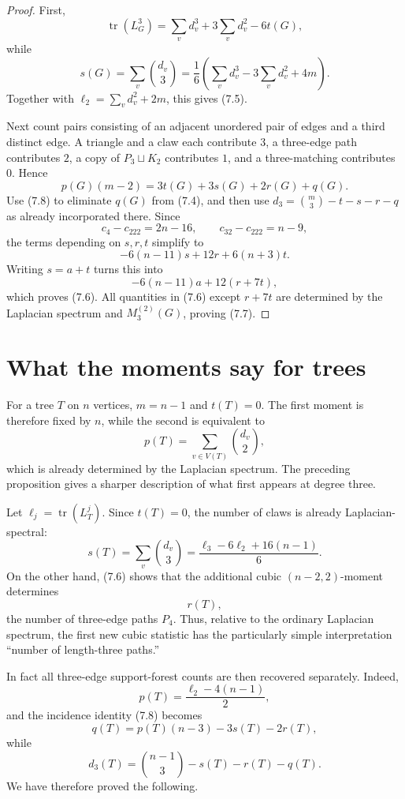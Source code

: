 \documentclass{amsart}
\theoremstyle{definition}
\newcommand{\tr}{\operatorname{tr}}
\begin{document}
\begin{proof}
First,
\[
\tr(L_G^3)=\sum_v d_v^3+3\sum_vd_v^2-6t(G),
\]
while
\[
s(G)=\sum_v\binom{d_v}{3}
=\frac{1}{6}\left(\sum_vd_v^3-3\sum_vd_v^2+4m\right).
\]
Together with $\ell_2=\sum_vd_v^2+2m$, this gives (7.5).

Next count pairs consisting of an adjacent unordered pair of edges and a
third distinct edge.  A triangle and a claw each contribute $3$, a
three-edge path contributes $2$, a copy of $P_3\sqcup K_2$ contributes $1$,
and a three-matching contributes $0$.  Hence
\[
p(G)(m-2)=3t(G)+3s(G)+2r(G)+q(G).
\tag{7.8}
\]
Use (7.8) to eliminate $q(G)$ from (7.4), and then use
$d_3=\binom m3-t-s-r-q$ as already incorporated there.  Since
\[
c_4-c_{222}=2n-16,\qquad
c_{32}-c_{222}=n-9,
\]
the terms depending on $s,r,t$ simplify to
\[
-6(n-11)s+12r+6(n+3)t.
\]
Writing $s=a+t$ turns this into
\[
-6(n-11)a+12(r+7t),
\]
which proves (7.6).  All quantities in (7.6) except $r+7t$ are determined
by the Laplacian spectrum and $M_3^{(2)}(G)$, proving (7.7).
\end{proof}

\section{What the moments say for trees}

For a tree $T$ on $n$ vertices, $m=n-1$ and $t(T)=0$.  The first moment is
therefore fixed by $n$, while the second is equivalent to
\[
p(T)=\sum_{v\in V(T)}\binom{d_v}{2},
\]
which is already determined by the Laplacian spectrum.  The preceding
proposition gives a sharper description of what first appears at degree
three.

Let $\ell_j=\tr(L_T^j)$.  Since $t(T)=0$, the number of claws is already
Laplacian-spectral:
\[
s(T)=\sum_v\binom{d_v}{3}
=\frac{\ell_3-6\ell_2+16(n-1)}{6}.
\tag{8.1}
\]
On the other hand, (7.6) shows that the additional cubic
$(n-2,2)$-moment determines
\[
r(T),
\tag{8.2}
\]
the number of three-edge paths $P_4$.  Thus, relative to the ordinary
Laplacian spectrum, the first new cubic statistic has the particularly
simple interpretation ``number of length-three paths.''

In fact all three-edge support-forest counts are then recovered separately.
Indeed,
\[
p(T)=\frac{\ell_2-4(n-1)}{2},
\]
and the incidence identity (7.8) becomes
\[
q(T)=p(T)(n-3)-3s(T)-2r(T),
\tag{8.3}
\]
while
\[
d_3(T)=\binom{n-1}{3}-s(T)-r(T)-q(T).
\tag{8.4}
\]
We have therefore proved the following.
\end{document}
